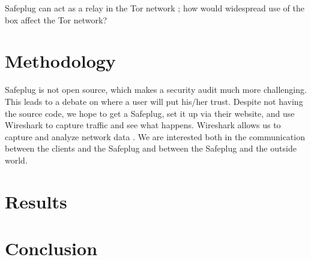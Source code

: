 \documentclass[12pt, letterpaper]{article}
\begin{document}
Safeplug can act as a relay in the Tor network \cite{techreview}; how would widespread use of the box affect the Tor network?

\section{Methodology}
Safeplug is not open source, which makes a security audit much more challenging.  This leads to a debate on where a user will put his/her trust.  Despite not having the source code, we hope to get a Safeplug, set it up via their website, and use Wireshark to capture traffic and see what happens.  Wireshark allows us to capture and analyze network data \cite{wireshark}.  We are interested both in the communication between the clients and the Safeplug and between the Safeplug and the outside world.  

\section{Results}

\section{Conclusion}


\end{document}
